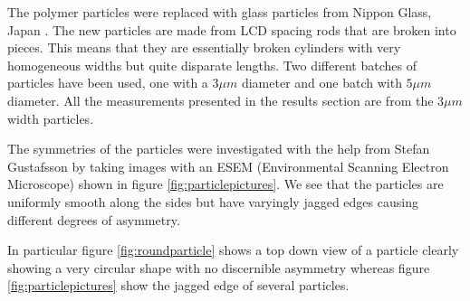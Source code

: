 The polymer particles were replaced with glass particles from Nippon Glass, Japan \cite{Particles}. The new particles are made 
from LCD spacing rods that are broken into pieces. This means that they are essentially broken cylinders with very 
homogeneous widths but quite disparate lengths. Two different batches of particles have been used, one with a $3\mu m$ diameter and one batch with $5 \mu m$ diameter. All the measurements presented in the results section are from the $3 \mu m$ width particles. 

The symmetries of the particles were investigated with the help from Stefan Gustafsson by taking images with an 
ESEM (Environmental Scanning Electron Microscope) shown in figure \ref{fig:particlepictures}. We see that the 
particles are uniformly smooth along the sides but have varyingly jagged edges causing different degrees of asymmetry. 

In particular figure \ref{fig:roundparticle} shows a top down view of a particle clearly showing a very circular shape 
with no discernible asymmetry whereas figure \ref{fig:particlepictures} show the jagged edge of several particles. 


